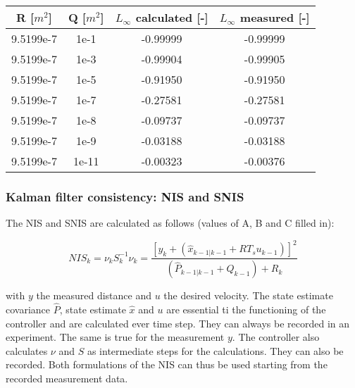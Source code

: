 \documentclass[a4paper]{article}
\newcommand{\newpar}{\vspace{.3cm}\noindent}
\begin{document}
\begin{center}
    \begin{tabular}{ |c|c|c|c|}
    \hline
    R [\(m^2\)] & Q [\(m^2\)] & \(L_\infty\) calculated [-] & \(L_\infty\) measured [-]  \\
    \hline
    9.5199e-7        & 1e-1     & -0.99999      &   -0.99999           \\
    \hline
    9.5199e-7        & 1e-3     & -0.99904      &  -0.99905                 \\
    \hline
    9.5199e-7        & 1e-5     & -0.91950      &  -0.91950            \\
    \hline
    9.5199e-7        & 1e-7     & -0.27581      & -0.27581           \\ 
    \hline
    9.5199e-7        & 1e-8     & -0.09737      & -0.09737           \\ 
    \hline
    9.5199e-7        & 1e-9     & -0.03188      & -0.03188           \\ 
    \hline
    9.5199e-7        & 1e-11    & -0.00323      & -0.00376           \\ 
    \hline
    \end{tabular}  
    \label{tab:location_Sys_31z_f}
\end{center}


\subsubsection{Kalman filter consistency: NIS and SNIS}

The NIS and SNIS are calculated as follows (values of A, B and C filled in):

\begin{equation}
    NIS_{k}=\nu_{k} S_{k}^{-1} \nu_{k} = \frac{\left[y_{k}+\left( \hat{x}_{k-1|k-1}+R T_{s} u_{k-1}\right)\right]^{2}}{\left( \hat{P}_{k-1|k-1}+Q_{k-1}\right)+R_{k}}
    \label{eq:nis}
\end{equation}

\newpar
with \(y\) the measured distance and \(u\) the desired velocity. The state estimate covariance $\hat{P}$, state estimate $\hat{x}$ and $u$ are essential ti the functioning of the controller and are calculated ever time step. They can always be recorded in an experiment. The same is true for the measurement $y$. The controller also calculates $\nu$ and $S$ as intermediate steps for the calculations. They can also be recorded. Both formulations of the NIS can thus be used starting from the recorded measurement data.
\end{document}
